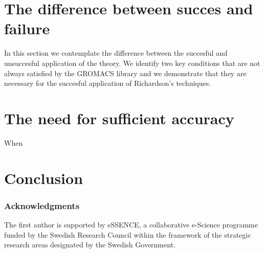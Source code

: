 \documentclass[runningheads]{llncs}
\begin{document}
\section{The difference between succes and failure}

In this section we contemplate the difference between the succesful and unsuccesful application of the theory. We identify two key conditions that are not always satisfied by the GROMACS library and we demonstrate that they are necessary for the succesful application of Richardson's techniques.

\section{The need for sufficient accuracy}

When 


\section{Conclusion}



\subsubsection{Acknowledgments}

The first author is supported by eSSENCE, a collaborative e-Science programme funded by the Swedish Research Council within the framework of the strategic research areas designated by the Swedish Government.


%
%
%


 
\end{document}

